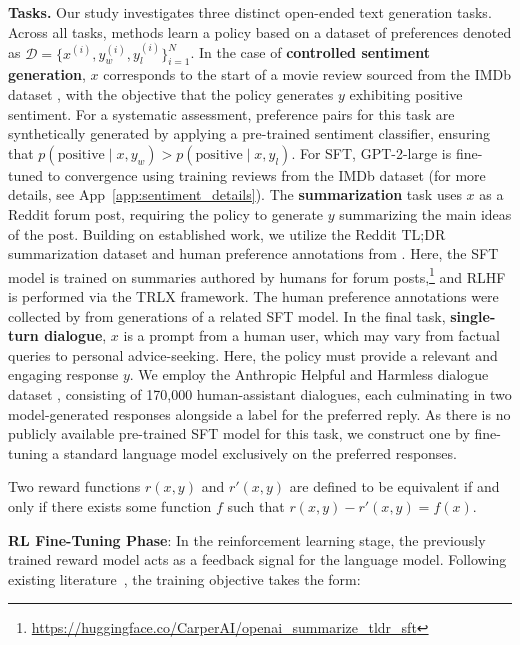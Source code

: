 \textbf{Tasks.} Our study investigates three distinct open-ended text generation tasks. Across all tasks, methods learn a policy based on a dataset of preferences denoted as $\mathcal{D}=\bigl\{x^{(i)}, y_w^{(i)}, y_l^{(i)}\bigr\}_{i=1}^N$. In the case of \textbf{controlled sentiment generation}, $x$ corresponds to the start of a movie review sourced from the IMDb dataset \cite{maas-EtAl:2011:ACL-HLT2011}, with the objective that the policy generates $y$ exhibiting positive sentiment. For a systematic assessment, preference pairs for this task are synthetically generated by applying a pre-trained sentiment classifier, ensuring that $p(\text{positive}\mid x,y_w)>p(\text{positive}\mid x,y_l)$. For SFT, GPT-2-large is fine-tuned to convergence using training reviews from the IMDb dataset (for more details, see App~\ref{app:sentiment_details}). The \textbf{summarization} task uses $x$ as a Reddit forum post, requiring the policy to generate $y$ summarizing the main ideas of the post. Building on established work, we utilize the Reddit TL;DR summarization dataset \citep{volske-etal-2017-tl} and human preference annotations from \citeauthor{stiennon2022learning}. Here, the SFT model is trained on summaries authored by humans for forum posts,\footnote{\url{https://huggingface.co/CarperAI/openai_summarize_tldr_sft}} and RLHF is performed via the TRLX \citep{leandro_von_werra_2023_7790115} framework. The human preference annotations were collected by \citeauthor{stiennon2022learning} from generations of a related SFT model. In the final task, \textbf{single-turn dialogue}, $x$ is a prompt from a human user, which may vary from factual queries to personal advice-seeking. Here, the policy must provide a relevant and engaging response $y$. We employ the Anthropic Helpful and Harmless dialogue dataset \citep{bai2022training}, consisting of 170,000 human-assistant dialogues, each culminating in two model-generated responses alongside a label for the preferred reply. As there is no publicly available pre-trained SFT model for this task, we construct one by fine-tuning a standard language model exclusively on the preferred responses.

\begin{definition}
Two reward functions $r(x, y)$ and $r'(x, y)$ are defined to be equivalent if and only if there exists some function $f$ such that ${r(x, y)-r'(x, y) = f(x)}$.
\end{definition}

\textbf{RL Fine-Tuning Phase}: In the reinforcement learning stage, the previously trained reward model acts as a feedback signal for the language model. Following existing literature~\citep{jaques2017sequence, jaques2020human}, the training objective takes the form:

